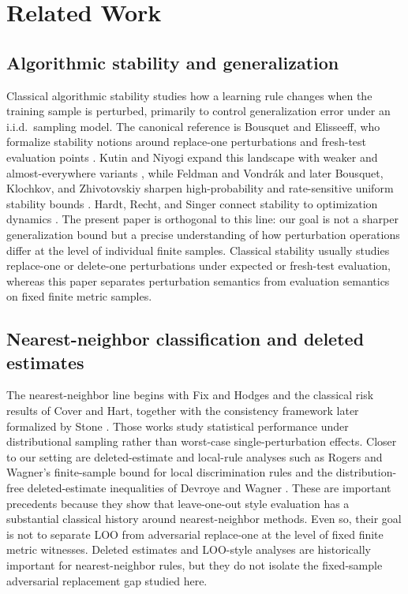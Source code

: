 \section{Related Work}
\label{sec:related-work}

\subsection{Algorithmic stability and generalization}

Classical algorithmic stability studies how a learning rule changes when the
training sample is perturbed, primarily to control generalization error under
an i.i.d.\ sampling model.  The canonical reference is Bousquet and Elisseeff,
who formalize stability notions around replace-one perturbations and fresh-test
evaluation points \cite{bousquet2002stability}.  Kutin and Niyogi expand this
landscape with weaker and almost-everywhere variants
\cite{kutin2002almost}, while Feldman and Vondr\'ak and later Bousquet,
Klochkov, and Zhivotovskiy sharpen high-probability and rate-sensitive uniform
stability bounds \cite{feldman2019high,bousquet2020sharpening}.  Hardt,
Recht, and Singer connect stability to optimization dynamics
\cite{hardt2016train}.  The present paper is orthogonal to this line: our goal
is not a sharper generalization bound but a precise understanding of how
perturbation operations differ at the level of individual finite samples.
Classical stability usually studies replace-one or delete-one perturbations
under expected or fresh-test evaluation, whereas this paper separates
perturbation semantics from evaluation semantics on fixed finite metric
samples.

\subsection{Nearest-neighbor classification and deleted estimates}

The nearest-neighbor line begins with Fix and Hodges and the classical risk
results of Cover and Hart, together with the consistency framework later
formalized by Stone \cite{fix1951discriminatory,cover1967nearest,cover1968estimation,stone1977consistent}.  Those works study statistical performance under
distributional sampling rather than worst-case single-perturbation effects.
Closer to our setting are deleted-estimate and local-rule analyses such as
Rogers and Wagner's finite-sample bound for local discrimination rules and the
distribution-free deleted-estimate inequalities of Devroye and Wagner
\cite{rogers1978finite,devroye1979distribution,devroye1979local}.  These are
important precedents because they show that leave-one-out style evaluation has a
substantial classical history around nearest-neighbor methods.  Even so, their
goal is not to separate LOO from adversarial replace-one at the level of fixed
finite metric witnesses.  Deleted estimates and LOO-style analyses are
historically important for nearest-neighbor rules, but they do not isolate the
fixed-sample adversarial replacement gap studied here.

